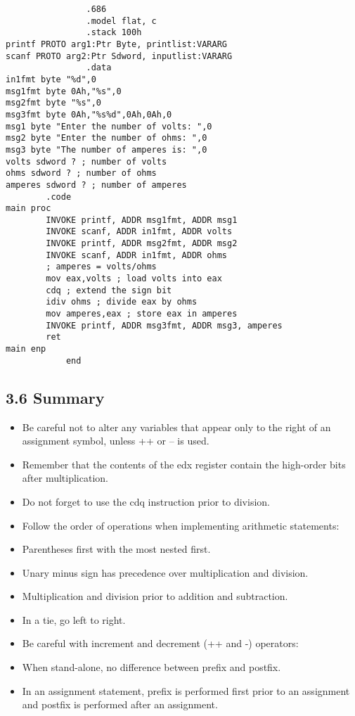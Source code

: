 \documentclass[10pt]{article}
\begin{document}
\begin{verbatim}
                .686
                .model flat, c
                .stack 100h
printf PROTO arg1:Ptr Byte, printlist:VARARG
scanf PROTO arg2:Ptr Sdword, inputlist:VARARG
                .data
in1fmt byte "%d",0
msg1fmt byte 0Ah,"%s",0
msg2fmt byte "%s",0
msg3fmt byte 0Ah,"%s%d",0Ah,0Ah,0
msg1 byte "Enter the number of volts: ",0
msg2 byte "Enter the number of ohms: ",0
msg3 byte "The number of amperes is: ",0
volts sdword ? ; number of volts
ohms sdword ? ; number of ohms
amperes sdword ? ; number of amperes
        .code
main proc
        INVOKE printf, ADDR msg1fmt, ADDR msg1
        INVOKE scanf, ADDR in1fmt, ADDR volts
        INVOKE printf, ADDR msg2fmt, ADDR msg2
        INVOKE scanf, ADDR in1fmt, ADDR ohms
        ; amperes = volts/ohms
        mov eax,volts ; load volts into eax
        cdq ; extend the sign bit
        idiv ohms ; divide eax by ohms
        mov amperes,eax ; store eax in amperes
        INVOKE printf, ADDR msg3fmt, ADDR msg3, amperes
        ret
main enp
            end
\end{verbatim}

\subsection*{3.6 Summary}
\begin{itemize}
  \item Be careful not to alter any variables that appear only to the right of an assignment symbol, unless ++ or -- is used.
  \item Remember that the contents of the edx register contain the high-order bits after multiplication.
  \item Do not forget to use the cdq instruction prior to division.
  \item Follow the order of operations when implementing arithmetic statements:
  \item Parentheses first with the most nested first.
  \item Unary minus sign has precedence over multiplication and division.
  \item Multiplication and division prior to addition and subtraction.
  \item In a tie, go left to right.
  \item Be careful with increment and decrement (++ and -) operators:
  \item When stand-alone, no difference between prefix and postfix.
  \item In an assignment statement, prefix is performed first prior to an assignment and postfix is performed after an assignment.
\end{itemize}
\end{document}
